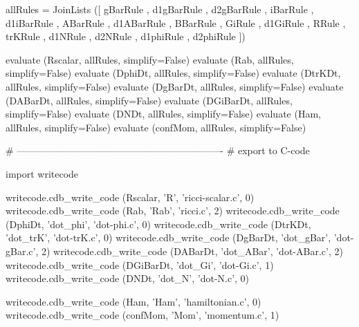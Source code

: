 \documentclass[12pt]{cdblatex}
\begin{document}
\begin{cadabra}
   allRules = JoinLists ([ gBarRule , d1gBarRule , d2gBarRule ,
                           iBarRule , d1iBarRule ,
                           ABarRule , d1ABarRule ,
                           BBarRule ,
                           GiRule , d1GiRule ,
                           RRule ,
                           trKRule ,
                           d1NRule , d2NRule ,
                           d1phiRule , d2phiRule ])

   evaluate (Rscalar,  allRules, simplify=False)
   evaluate (Rab,      allRules, simplify=False)
   evaluate (DphiDt,   allRules, simplify=False)
   evaluate (DtrKDt,   allRules, simplify=False)
   evaluate (DgBarDt,  allRules, simplify=False)
   evaluate (DABarDt,  allRules, simplify=False)
   evaluate (DGiBarDt, allRules, simplify=False)
   evaluate (DNDt,     allRules, simplify=False)
   evaluate (Ham,      allRules, simplify=False)
   evaluate (confMom,  allRules, simplify=False)

   # ----------------------------------------------------------------
   # export to C-code

   import writecode

   writecode.cdb_write_code (Rscalar,  'R',         'ricci-scalar.c', 0)
   writecode.cdb_write_code (Rab,      'Rab',       'ricci.c',        2)
   writecode.cdb_write_code (DphiDt,   'dot_phi',   'dot-phi.c',      0)
   writecode.cdb_write_code (DtrKDt,   'dot_trK',   'dot-trK.c',      0)
   writecode.cdb_write_code (DgBarDt,  'dot_gBar',  'dot-gBar.c',     2)
   writecode.cdb_write_code (DABarDt,  'dot_ABar',  'dot-ABar.c',     2)
   writecode.cdb_write_code (DGiBarDt, 'dot_Gi',    'dot-Gi.c',       1)
   writecode.cdb_write_code (DNDt,     'dot_N',     'dot-N.c',        0)

   writecode.cdb_write_code (Ham,      'Ham',       'hamiltonian.c',  0)
   writecode.cdb_write_code (confMom,  'Mom',       'momentum.c',     1)

\end{cadabra}
\end{document}
